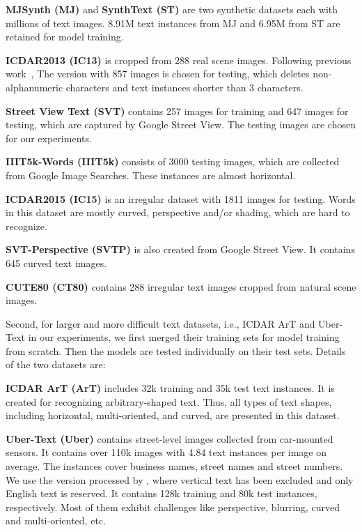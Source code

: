 \noindent\textbf{MJSynth (MJ)} \citep{MJor90K} and \textbf{SynthText (ST)} \citep{ST} are two synthetic datasets each with millions of text images. 8.91M text instances from MJ and 6.95M from ST are retained for model training. 

\noindent\textbf{ICDAR2013 (IC13)}
is cropped from 288 real scene images. Following previous work~\citep{Baekwhats_wrong_19ICCV}, The version with 857 images is chosen for testing, which deletes non-alphanumeric characters and text instances shorter than 3 characters. 

\noindent\textbf{Street View Text (SVT)} \citep{SVT} 
contains 257 images for training and 647 images for testing, which are captured by Google Street View. The testing images are chosen for our experiments.

\noindent\textbf{IIIT5k-Words (IIIT5k)} \citep{IIIT5K} 
consists of 3000 testing images, which are collected from Google Image Searches. These instances are almost horizontal.

\noindent\textbf{ICDAR2015 (IC15)} \citep{ICDAR2015} 
is an irregular dataset with 1811 images for testing. Words in this dataset are mostly curved, perspective and/or shading, which are hard to recognize.

\noindent\textbf{SVT-Perspective (SVTP)} \citep{SVT-P} 
is also created from Google Street View. It contains 645 curved text images. 

\noindent\textbf{CUTE80 (CT80)} \citep{CUTE80} 
contains 288 irregular text images cropped from natural scene images.

Second, for larger and more difficult text datasets, i.e., ICDAR ArT \citep{chng2019art} and Uber-Text \citep{zhang2017uber} in our experiments, we first merged their training sets for model training from scratch. Then the models are tested individually on their test sets. Details of the two datasets are:

\noindent\textbf{ICDAR ArT (ArT)} \citep{chng2019art}
includes 32k training and 35k test text instances. It is created for recognizing arbitrary-shaped text. Thus, all types of text shapes, including horizontal, multi-oriented, and curved, are presented in this dataset. 


\noindent\textbf{Uber-Text (Uber)} \citep{zhang2017uber} 
contains street-level images collected from car-mounted sensors. It contains over 110k images with 4.84 text instances per image on average. The instances cover business names, street names and street numbers. We use the version processed by \cite{baek2021realdataset}, where vertical text has been excluded and only English text is reserved. It contains 128k training and 80k test instances, respectively. Most of them exhibit challenges like perspective, blurring, curved and multi-oriented, etc.

